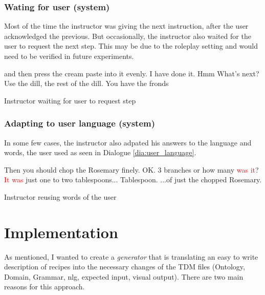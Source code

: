 \documentclass[
	11pt, %
]{fphw}
\newenvironment{captionedDialogue}
    {\captionsetup{
        type=Dialogue,
        skip=2pt,
        belowskip=13pt
        }
    }
    {}
\newenvironment{mydialogue}
    {\begin{snugshade}
     \hrulefill
     \begin{dialogue}}
    {\end{dialogue}
     \hrulefill
     \end{snugshade}}
\begin{document}
\subsubsection*{Wating for user (system)}
Most of the time the instructor was giving the next instruction, after the user acknowledged the previous. But occasionally, the instructor also waited for the user to request the next step. This may be due to the roleplay setting and would need to be verified in future experiments.

\begin{captionedDialogue}
    \begin{mydialogue}
         and then press the cream paste into it evenly. 
         I have done it.
         Hmm 
         What's next? 
         Use the dill, the rest of the dill. You have the fronds
    \end{mydialogue}
    \caption{Instructor waiting for user to request step}
    \label{dia:instructor_waiting}
\end{captionedDialogue}

\subsubsection*{Adapting to user language (system)}
In some few cases, the instructor also adpated his answers to the language and words, the user used as seen in Dialogue \ref{dia:user_language}.

\begin{captionedDialogue}
    \begin{mydialogue}
         Then you should chop the Rosemary finely.
         OK. 3 branches or how many \textcolor{red}{was it}? 
         \textcolor{red}{It was} just one to two tablespoons... 
         Tablespoon. 
         ...of just the chopped Rosemary.
    \end{mydialogue}
    \caption{Instructor reusing words of the user}
    \label{dia:user_language}
\end{captionedDialogue}


\section*{Implementation}
As mentioned, I wanted to create a \emph{generator} that is translating an easy to write description of recipes into the necessary changes of the TDM files (Ontology, Domain, Grammar, nlg, expected input, visual output). There are two main reasons for this approach. 
\end{document}

